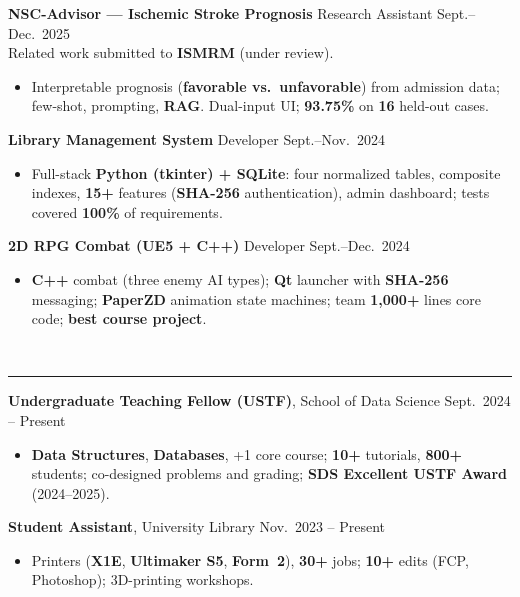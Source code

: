 \documentclass[9pt,letterpaper]{article}
\newcommand{\cvsec}[1]{%
  \par\addvspace{0.32em}%
  \noindent{\normalsize\bfseries #1}\\[-0.22em]%
  \rule{\linewidth}{0.4pt}%
  \par\vspace{0.14em}%
}
\begin{document}
\vspace{0.06em}
\noindent\textbf{NSC-Advisor --- Ischemic Stroke Prognosis} \quad Research Assistant \hfill {\normalsize Sept.--Dec.\ 2025}\\
{\footnotesize Related work submitted to \textbf{ISMRM} (under review).}
\begin{itemize}
  \item Interpretable prognosis (\textbf{favorable vs.\ unfavorable}) from admission data; few-shot, prompting, \textbf{RAG}. Dual-input UI; \textbf{93.75\%} on \textbf{16} held-out cases.
\end{itemize}

\vspace{0.06em}
\noindent\textbf{Library Management System} \quad Developer \hfill {\normalsize Sept.--Nov.\ 2024}
\begin{itemize}
  \item Full-stack \textbf{Python (tkinter) + SQLite}: four normalized tables, composite indexes, \textbf{15+} features (\textbf{SHA-256} authentication), admin dashboard; tests covered \textbf{100\%} of requirements.
\end{itemize}

\vspace{0.06em}
\noindent\textbf{2D RPG Combat (UE5 + C++)} \quad Developer \hfill {\normalsize Sept.--Dec.\ 2024}
\begin{itemize}
  \item \textbf{C++} combat (three enemy AI types); \textbf{Qt} launcher with \textbf{SHA-256} messaging; \textbf{PaperZD} animation state machines; team \textbf{1,000+} lines core code; \textbf{best course project}.
\end{itemize}

\cvsec{Campus Roles, Honors \& Skills}
\textbf{Undergraduate Teaching Fellow (USTF)}, School of Data Science \hfill {\normalsize Sept.\ 2024 -- Present}
\begin{itemize}
  \item \textbf{Data Structures}, \textbf{Databases}, +1 core course; \textbf{10+} tutorials, \textbf{800+} students; co-designed problems and grading; \textbf{SDS Excellent USTF Award} (2024--2025).
\end{itemize}

\vspace{0.08em}
\noindent\textbf{Student Assistant}, University Library \hfill {\normalsize Nov.\ 2023 -- Present}
\begin{itemize}
  \item Printers (\textbf{X1E}, \textbf{Ultimaker S5}, \textbf{Form~2}), \textbf{30+} jobs; \textbf{10+} edits (FCP, Photoshop); 3D-printing workshops.
\end{itemize}
\end{document}
